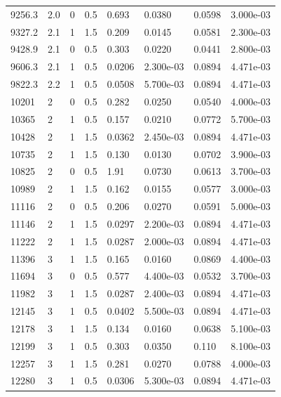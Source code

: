 \documentclass[preview]{standalone}
\begin{document}
{{{\begin{tabular}{L{1.2cm}C{1.2cm} C{0.3cm}C{0.5cm} C{1.4cm}C{1.4cm} C{1.4cm}C{1.4cm}}
  9256.3  &   2.0  & 0     & 0.5 &  0.693  & 0.0380  & 0.0598 &  3.000e-03   \\ 
  9327.2  &   2.1  & 1     & 1.5 &  0.209  & 0.0145  & 0.0581 &  2.300e-03   \\ 
  9428.9  &   2.1  & 0     & 0.5 &  0.303  & 0.0220  & 0.0441 &  2.800e-03   \\ 
  9606.3  &   2.1  & 1     & 0.5 &  0.0206  & 2.300e-03  & 0.0894 &  4.471e-03   \\ 
  9822.3  &   2.2  & 1     & 0.5 &  0.0508  & 5.700e-03  & 0.0894 &  4.471e-03   \\ 
  10201  &     2  & 0     & 0.5 &  0.282  & 0.0250  & 0.0540 &  4.000e-03   \\ 
  10365  &     2  & 1     & 0.5 &  0.157  & 0.0210  & 0.0772 &  5.700e-03   \\ 
  10428  &     2  & 1     & 1.5 &  0.0362  & 2.450e-03  & 0.0894 &  4.471e-03   \\ 
  10735  &     2  & 1     & 1.5 &  0.130  & 0.0130  & 0.0702 &  3.900e-03   \\ 
  10825  &     2  & 0     & 0.5 &  1.91  & 0.0730  & 0.0613 &  3.700e-03   \\ 
  10989  &     2  & 1     & 1.5 &  0.162  & 0.0155  & 0.0577 &  3.000e-03   \\ 
  11116  &     2  & 0     & 0.5 &  0.206  & 0.0270  & 0.0591 &  5.000e-03   \\ 
  11146  &     2  & 1     & 1.5 &  0.0297  & 2.200e-03  & 0.0894 &  4.471e-03   \\ 
  11222  &     2  & 1     & 1.5 &  0.0287  & 2.000e-03  & 0.0894 &  4.471e-03   \\ 
  11396  &     3  & 1     & 1.5 &  0.165  & 0.0160  & 0.0869 &  4.400e-03   \\ 
  11694  &     3  & 0     & 0.5 &  0.577  & 4.400e-03  & 0.0532 &  3.700e-03   \\ 
  11982  &     3  & 1     & 1.5 &  0.0287  & 2.400e-03  & 0.0894 &  4.471e-03   \\ 
  12145  &     3  & 1     & 0.5 &  0.0402  & 5.500e-03  & 0.0894 &  4.471e-03   \\ 
  12178  &     3  & 1     & 1.5 &  0.134  & 0.0160  & 0.0638 &  5.100e-03   \\ 
  12199  &     3  & 1     & 0.5 &  0.303  & 0.0350  & 0.110 &  8.100e-03   \\ 
  12257  &     3  & 1     & 1.5 &  0.281  & 0.0270  & 0.0788 &  4.000e-03   \\ 
  12280  &     3  & 1     & 0.5 &  0.0306  & 5.300e-03  & 0.0894 &  4.471e-03   \\ 

\end{tabular}}}}
\end{document}
